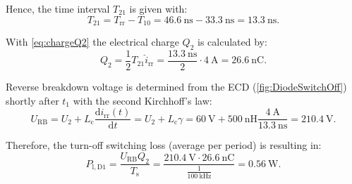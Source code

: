\begin{solutionblock}
	Hence, the time interval $T_{21}$ is given with:
	\begin{equation}
		T_{21} = T_{\mathrm{rr}} - T_{10} = \SI{46.6}{\nano\second} - \SI{33.3}{\nano\second} = \SI{13.3}{\nano\second}.
	\end{equation}

	With \eqref{eq:chargeQ2} the electrical charge $Q_2$ is calculated by:
	\begin{equation}
		Q_2 = \frac{1}{2} T_{21} \hat{i}_{\mathrm{rr}} = \frac{\SI{13.3}{\nano\second}}{2} \cdot \SI{4}{\ampere} = \SI{26.6}{\nano\coulomb}.
	\end{equation}

	Reverse breakdown voltage is determined from the ECD (\autoref{fig:DiodeSwitchOff}) shortly after $t_1$ with the second Kirchhoff's law:
	\begin{equation}
		U_{\mathrm{RB}} = U_2 + L_{\mathrm{c}} \frac{\mathrm{d}i_{\mathrm{rr}}(t)}{\mathrm{d}t} = U_2 + L_{\mathrm{c}} \gamma = \SI{60}{\volt} + \SI{500}{\nano\henry} \frac{\SI{4}{\ampere}}{\SI{13.3}{\nano\second}} = \SI{210.4}{\volt}.
		\label{eq:reverseBreakdownVoltage}
	\end{equation}

	Therefore, the turn-off switching loss (average per period) is resulting in:
	\begin{equation}
		P_{\mathrm{l,D1}} = \frac{U_{\mathrm{RB}}Q_2}{T_{\mathrm{s}}} = \frac{\SI{210.4}{\volt}\cdot \SI{26.6}{\nano\coulomb}}{\frac{1}{\SI{100}{\kilo\hertz}}} = \SI{0.56}{\watt}.
	\end{equation}

\end{solutionblock}


